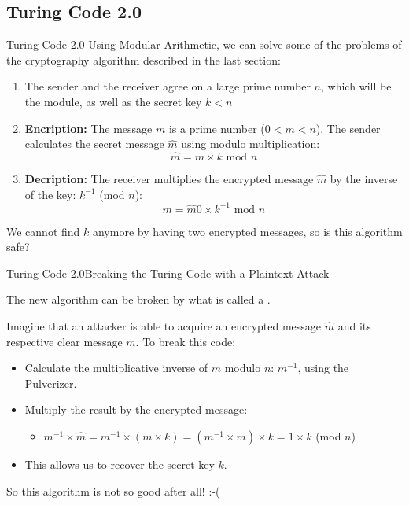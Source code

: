 \subsection{Turing Code 2.0}

\begin{frame}{Turing Code 2.0}
  Using Modular Arithmetic, we can solve some of the problems of the cryptography algorithm described in the last section:

  \begin{enumerate}
    \item The sender and the receiver agree on a large prime number $n$, which will be the module, as well as the secret key $k < n$
    \item {\bf Encription:} The message $m$ is a prime number ($0 < m < n$). The sender calculates the secret message $\hat{m}$ using modulo multiplication:
    \begin{equation*}
      \hat{m} = m\times k \text{ mod }n
    \end{equation*}
    \item {\bf Decription:} The receiver multiplies the encrypted message $\hat{m}$ by the inverse of the key: $k^{-1}$ (mod $n$):
    \begin{equation*}
      m = \hat{m}0\times k^{-1} \text{ mod }n
    \end{equation*}
  \end{enumerate}
  We cannot find $k$ anymore by having two encrypted messages, so is this algorithm safe?
\end{frame}

\begin{frame}{Turing Code 2.0}{Breaking the Turing Code with a Plaintext Attack}

  The new algorithm can be broken by what is called a .\bigskip

  Imagine that an attacker is able to acquire an encrypted message $\hat{m}$ and its respective clear message $m$. To break this code:\bigskip

  \begin{itemize}
    \item Calculate the multiplicative inverse of $m$ modulo $n$: $m^{-1}$, using the Pulverizer.
    \item Multiply the result by the encrypted message:
    \begin{itemize}
      \item $m^{-1}\times \hat{m} = m^{-1}\times (m \times k) = (m^{-1} \times m) \times k = 1\times k$ (mod $n$)
    \end{itemize}
    \item This allows us to recover the secret key $k$.
  \end{itemize}\bigskip

  So this algorithm is not so good after all! :-(
\end{frame}
